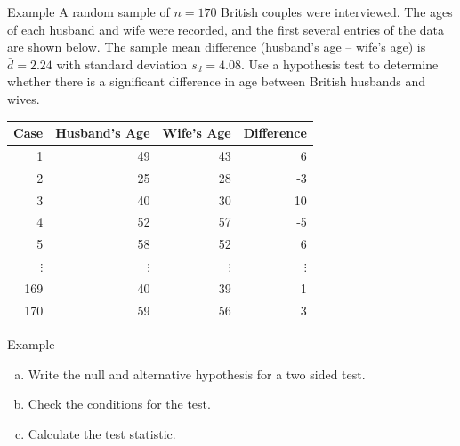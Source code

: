 \documentclass[10pt, fleqn]{beamer}
\begin{document}
\begin{frame}{Example}
A random sample of $n=170$ British couples were interviewed.  The ages of each husband and wife were recorded, and the first several entries of the data are shown below.  The sample mean difference (husband's age -- wife's age) is $\bar{d} = 2.24$ with standard deviation $s_d = 4.08$.  Use a hypothesis test to determine whether there is a significant difference in age between British husbands and wives.\\
\bigskip

\begin{tabular}{rrrr}
\hline
Case & Husband's Age & Wife's Age & Difference \\
\hline
1 &  49 &  43 &   6 \\
2 &  25 &  28 &  -3 \\
3 &  40 &  30 &  10 \\
4 &  52 &  57 &  -5 \\
5 &  58 &  52 &   6 \\
$\vdots$ & $\vdots$ & $\vdots$ & $\vdots$\\
169 &  40 &  39 &   1 \\ 
170 &  59 &  56 &   3 \\ 
\hline
\end{tabular}
\end{frame}

\begin{frame}{Example}
\begin{enumerate}[(a)]
\item Write the null and alternative hypothesis for a two sided test.\\
\vspace{1cm}
\item Check the conditions for the test.\\
\vspace{3cm}
\item Calculate the test statistic.\\
\vspace{2.75cm}
\end{enumerate}
\end{frame}
\end{document}
